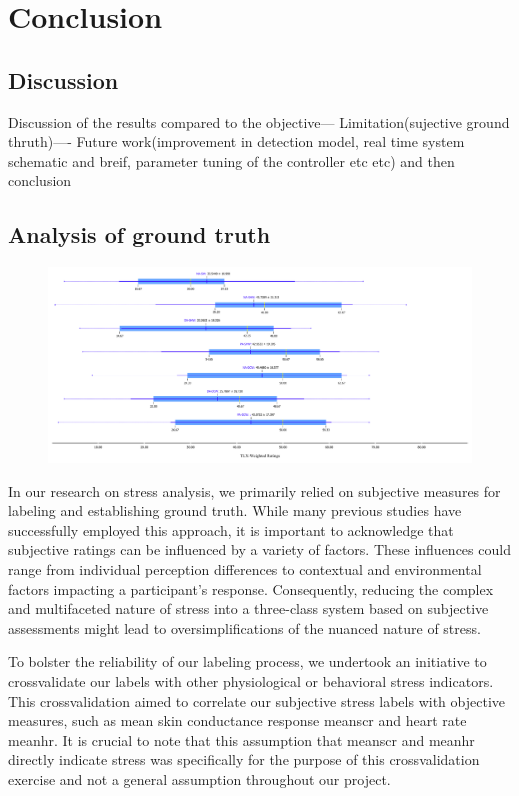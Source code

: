\chapter{Conclusion}
\section{Discussion}

Discussion of the results compared to the objective--- Limitation(sujective ground thruth)---- Future work(improvement in detection model, real time system schematic and breif, parameter tuning of the controller etc etc)
and then conclusion


\section{Analysis of ground truth}

\begin{figure}[!htbp]
	\centering
	\includegraphics[width=\columnwidth]{images/tlx.pdf}
	\caption{}
	\label{fig:netwrok}
\end{figure}

In our research on stress analysis, we primarily relied on subjective measures for labeling and establishing ground truth. While many previous studies have successfully employed this approach, it is important to acknowledge that subjective ratings can be influenced by a variety of factors. These influences could range from individual perception differences to contextual and environmental factors impacting a participant's response. Consequently, reducing the complex and multifaceted nature of stress into a three-class system based on subjective assessments might lead to oversimplifications of the nuanced nature of stress.


To bolster the reliability of our labeling process, we undertook an initiative to crossvalidate our labels with other physiological or behavioral stress indicators. This crossvalidation aimed to correlate our subjective stress labels with objective measures, such as mean skin conductance response meanscr and heart rate meanhr. It is crucial to note that this assumption that meanscr and meanhr directly indicate stress was specifically for the purpose of this crossvalidation exercise and not a general assumption throughout our project.


